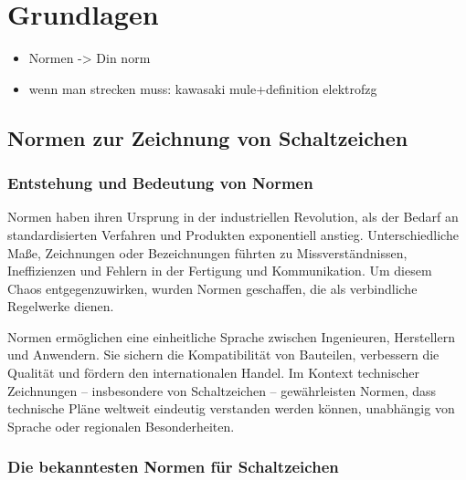 \chapter{Grundlagen}
\label{cha:Grundlagen}
	\begin{itemize}
	\item Normen -> Din norm
	\item wenn man strecken muss: kawasaki mule+definition elektrofzg
\end{itemize}
\section{Normen zur Zeichnung von Schaltzeichen}

\subsection*{Entstehung und Bedeutung von Normen}

Normen haben ihren Ursprung in der industriellen Revolution, als der Bedarf an standardisierten Verfahren und Produkten exponentiell anstieg. Unterschiedliche Maße, Zeichnungen oder Bezeichnungen führten zu Missverständnissen, Ineffizienzen und Fehlern in der Fertigung und Kommunikation. Um diesem Chaos entgegenzuwirken, wurden Normen geschaffen, die als verbindliche Regelwerke dienen.

Normen ermöglichen eine einheitliche Sprache zwischen Ingenieuren, Herstellern und Anwendern. Sie sichern die Kompatibilität von Bauteilen, verbessern die Qualität und fördern den internationalen Handel. Im Kontext technischer Zeichnungen – insbesondere von Schaltzeichen – gewährleisten Normen, dass technische Pläne weltweit eindeutig verstanden werden können, unabhängig von Sprache oder regionalen Besonderheiten.

\subsection*{Die bekanntesten Normen für Schaltzeichen}

